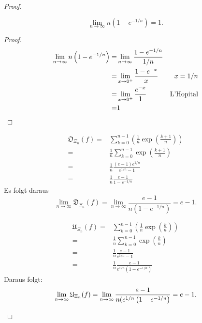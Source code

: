 \begin{proof}
	\begin{parts}
	\item 
		\begin{Lemma}
			\[\lim_{n \to \infty} n\left( 1-e^{- 1 / n} \right) =1.\]
		\end{Lemma}
		\begin{proof}
			\begin{align*}
				\lim_{n \to \infty} n\left( 1-e^{-1 / n} \right) =&\lim_{n \to \infty} \frac{1 - e^{-1 / n}}{1 / n}\\
				=&\lim_{x \to 0^+} \frac{1-e^{-x}}{x} & x= 1 / n\\
				=&\lim_{x \to 0^+} \frac{e^{-x}}{1}&\text{L'Hopital}\\
				=&1\qedhere
			\end{align*}
		\end{proof}
\begin{align*}
	\mathfrak{O}_{\Xi_n}(f)=&\sum_{k=0}^{n-1} \left( \frac{1}{n}\exp\left( \frac{k+1}{n} \right)  \right)\\ 
	=&\frac{1}{n}\sum_{k=0}^{n-1} \exp\left( \frac{k+1}{n} \right)\\
	=& \frac{1}{n}\frac{(e-1)e^{1 / n}}{e^{1 / n}-1}\\
	=&\frac{1}{n}\frac{e-1}{1-e^{-1 / n}} 
\end{align*}
Es folgt daraus
\[
	\lim_{n \to \infty} \mathfrak{D}_{\Xi_n}(f)=\lim_{n \to \infty} \frac{e-1}{n\left( 1-e^{-1 / n} \right) }=e-1
.\] 
\item 
	\begin{align*}
		\mathfrak{U}_{\Xi_n}(f)=&\sum_{k=0}^{n-1} \left( \frac{1}{n}\exp\left( \frac{k}{n} \right)  \right) \\
		=&\frac{1}{n}\sum_{k=0}^{n-1} \exp\left( \frac{k}{n} \right)\\
		=&\frac{1}{n}\frac{e-1}{e^{1 / n}-1}\\
		=&\frac{1}{n}\frac{e-1}{e^{1 / n}\left( 1-e^{- 1 / n} \right) }
	\end{align*}
	Daraus folgt:
	\[
		\lim_{n \to \infty} \mathfrak{U}_{\Xi_n}(f)=\lim_{n \to \infty} \frac{e-1}{n(e^{1 / n}\left( 1-e^{-1 / n} \right) }=e-1
	.\qedhere\] 
	\end{parts}
\end{proof}
